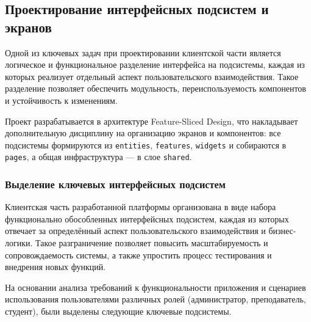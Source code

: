 \subsection{Проектирование интерфейсных подсистем и экранов}

Одной из ключевых задач при проектировании клиентской части является логическое и функциональное разделение интерфейса на подсистемы, каждая из которых реализует отдельный аспект пользовательского взаимодействия. Такое разделение позволяет обеспечить модульность, переиспользуемость компонентов и устойчивость к изменениям.

Проект разрабатывается в архитектуре Feature-Sliced Design, что накладывает дополнительную дисциплину на организацию экранов и компонентов: все подсистемы формируются из \texttt{entities}, \texttt{features}, \texttt{widgets} и собираются в \texttt{pages}, а общая инфраструктура — в слое \texttt{shared}.

\subsubsection{Выделение ключевых интерфейсных подсистем}

Клиентская часть разработанной платформы организована в виде набора функционально обособленных интерфейсных подсистем, каждая из которых отвечает за определённый аспект пользовательского взаимодействия и бизнес-логики. Такое разграничение позволяет повысить масштабируемость и сопровождаемость системы, а также упростить процесс тестирования и внедрения новых функций.

На основании анализа требований к функциональности приложения и сценариев использования пользователями различных ролей (администратор, преподаватель, студент), были выделены следующие ключевые подсистемы.

